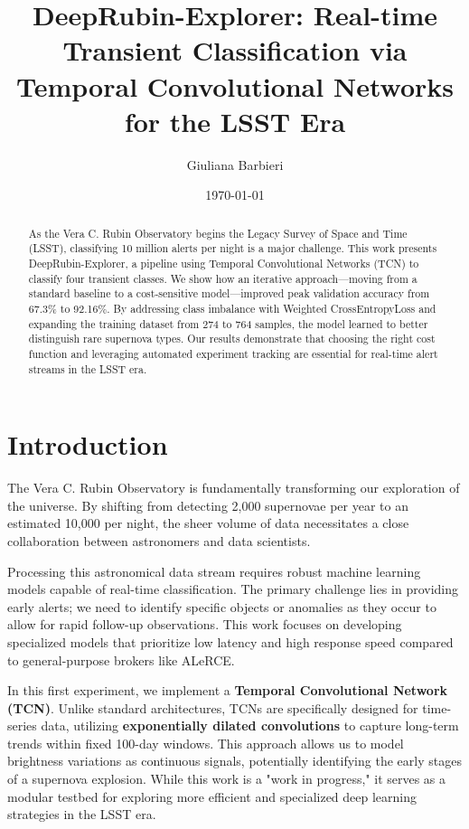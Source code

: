 \documentclass[twocolumn, 10pt]{article} %
\title{\textbf{DeepRubin-Explorer: Real-time Transient Classification via Temporal Convolutional Networks for the LSST Era}}
\author{Giuliana Barbieri}
\affil{ML Engineer}
\date{\today}
\begin{document}
\maketitle

\begin{abstract}
As the Vera C. Rubin Observatory begins the Legacy Survey of Space and Time (LSST), classifying 10 million alerts per night is a major challenge. This work presents DeepRubin-Explorer, a pipeline using Temporal Convolutional Networks (TCN) to classify four transient classes. We show how an iterative approach—moving from a standard baseline to a cost-sensitive model—improved peak validation accuracy from 67.3\% to 92.16\%. By addressing class imbalance with Weighted CrossEntropyLoss and expanding the training dataset from 274 to 764 samples, the model learned to better distinguish rare supernova types. Our results demonstrate that choosing the right cost function and leveraging automated experiment tracking are essential for real-time alert streams in the LSST era.
\end{abstract}

\section{Introduction}
The Vera C. Rubin Observatory is fundamentally transforming our exploration of the universe. By shifting from detecting 2,000 supernovae per year to an estimated 10,000 per night, the sheer volume of data necessitates a close collaboration between astronomers and data scientists. 

Processing this astronomical data stream requires robust machine learning models capable of real-time classification. The primary challenge lies in providing early alerts; we need to identify specific objects or anomalies as they occur to allow for rapid follow-up observations. This work focuses on developing specialized models that prioritize low latency and high response speed compared to general-purpose brokers like ALeRCE.

In this first experiment, we implement a \textbf{Temporal Convolutional Network (TCN)}. Unlike standard architectures, TCNs are specifically designed for time-series data, utilizing \textbf{exponentially dilated convolutions} to capture long-term trends within fixed 100-day windows. This approach allows us to model brightness variations as continuous signals, potentially identifying the early stages of a supernova explosion. While this work is a "work in progress," it serves as a modular testbed for exploring more efficient and specialized deep learning strategies in the LSST era.
\end{document}
